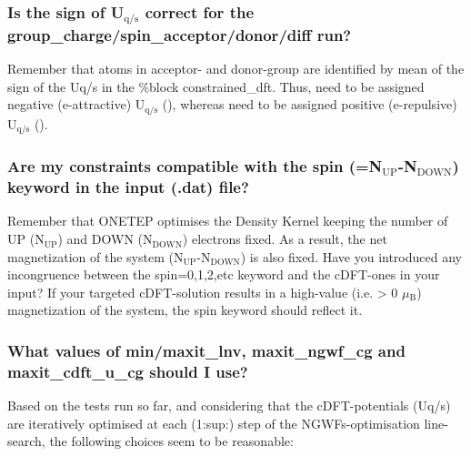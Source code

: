 \documentclass[letterpaper,10pt,english]{sphinxmanual}
\begin{document}
\subsubsection{Is the sign of U$_{\text{q/s}}$ correct for the group\_charge/spin\_acceptor/donor/diff run?}
\label{\detokenize{cDFT:is-the-sign-of-uq-s-correct-for-the-group-charge-spin-acceptor-donor-diff-run}}
Remember that atoms in acceptor- and donor-group are identified by mean
of the sign of the Uq/s in the \%block constrained\_dft. Thus,
 need to be assigned negative (e-attractive)
U$_{\text{q/s}}$ (), whereas 
need to be assigned positive (e-repulsive) U$_{\text{q/s}}$
().


\subsubsection{Are my constraints compatible with the spin (=N$_{\text{UP}}$-N$_{\text{DOWN}}$) keyword in the input (.dat) file?}
\label{\detokenize{cDFT:are-my-constraints-compatible-with-the-spin-nup-ndown-keyword-in-the-input-dat-file}}
Remember that ONETEP optimises the Density Kernel keeping the number of
UP (N$_{\text{UP}}$) and DOWN (N$_{\text{DOWN}}$) electrons fixed. As a result,
the net magnetization of the system (N$_{\text{UP}}$-N$_{\text{DOWN}}$) is also
fixed. Have you introduced any incongruence between the spin=0,1,2,etc
keyword and the cDFT-ones in your input? If your targeted cDFT-solution
results in a high-value (i.e. \textgreater{} 0 \(\mu\)$_{\text{B}}$) magnetization of the
 system, the spin keyword should reflect it.


\subsubsection{What values of min/maxit\_lnv, maxit\_ngwf\_cg and maxit\_cdft\_u\_cg should I use?}
\label{\detokenize{cDFT:what-values-of-min-maxit-lnv-maxit-ngwf-cg-and-maxit-cdft-u-cg-should-i-use}}
Based on the tests run so far, and considering that the cDFT-potentials
(Uq/s) are iteratively optimised at each (1:sup:) step of the
NGWFs-optimisation line-search, the following choices seem to be
reasonable:

%
\begin{sphinxVerbatim}[commandchars=\\\{\}]
  
  
  
  
  
  
  
  
  
\end{sphinxVerbatim}
\end{document}
